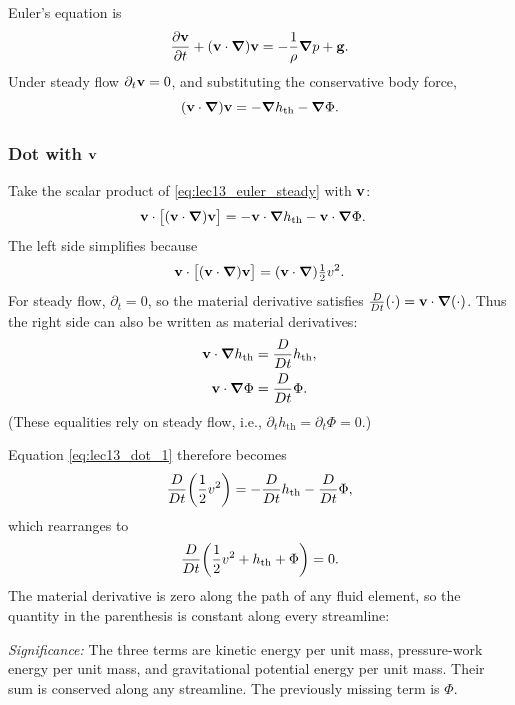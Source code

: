 \documentclass[../main.tex]{subfiles}
\begin{document}
Euler's equation is
\begin{equation}
  \pdv{\mathbf{v}}{t}+(\mathbf{v}\cdot\grad)\mathbf{v} = -\frac{1}{\rho}\grad p + \mathbf{g}.
  \label{eq:lec13_euler}
\end{equation}
Under steady flow $\partial_t\mathbf{v}=0$, and substituting the conservative body force,
\begin{equation}
  (\mathbf{v}\cdot\grad)\mathbf{v} = -\grad h_{\mathrm{th}} - \grad\Phi.
  \label{eq:lec13_euler_steady}
\end{equation}

\subsubsection{Dot with $\mathbf{v}$}
Take the scalar product of \eqref{eq:lec13_euler_steady} with $\mathbf{v}$:
\begin{align}
  \mathbf{v}\cdot\bigl[(\mathbf{v}\cdot\grad)\mathbf{v}\bigr]
  &= -\mathbf{v}\cdot\grad h_{\mathrm{th}} - \mathbf{v}\cdot\grad\Phi.
  \label{eq:lec13_dot_1}
\end{align}
The left side simplifies because
\begin{equation}
  \mathbf{v}\cdot\bigl[(\mathbf{v}\cdot\grad)\mathbf{v}\bigr]
  = (\mathbf{v}\cdot\grad)\tfrac{1}{2}v^2.
  \label{eq:lec13_kinetic_identity}
\end{equation}
For steady flow, $\partial_t=0$, so the material derivative satisfies $\frac{D}{Dt}(\cdot)=\mathbf{v}\cdot\grad(\cdot)$. Thus the right side can also be written as material derivatives:
\begin{align}
  \mathbf{v}\cdot\grad h_{\mathrm{th}} &= \frac{D}{Dt} h_{\mathrm{th}},\\
  \mathbf{v}\cdot\grad\Phi &= \frac{D}{Dt}\Phi.
\end{align}
(These equalities rely on steady flow, i.e., $\partial_t h_{\mathrm{th}}=\partial_t\Phi=0$.)

Equation \eqref{eq:lec13_dot_1} therefore becomes
\begin{equation}
  \frac{D}{Dt}\!\left(\frac{1}{2}v^2\right) = -\frac{D}{Dt} h_{\mathrm{th}} - \frac{D}{Dt}\Phi,
\end{equation}
which rearranges to
\begin{equation}
  \frac{D}{Dt}\!\left(\frac{1}{2}v^2 + h_{\mathrm{th}} + \Phi\right) = 0.
  \label{eq:lec13_bernoulli_material}
\end{equation}
The material derivative is zero along the path of any fluid element, so the quantity in the parenthesis is constant along every streamline:

\textit{Significance:} The three terms are kinetic energy per unit mass, pressure-work energy per unit mass, and gravitational potential energy per unit mass. Their sum is conserved along any streamline. The previously missing term is $\Phi$.
\end{document}
